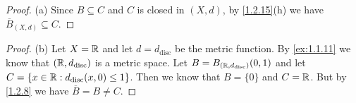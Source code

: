 \begin{proof}{(a)}
  Since \(B \subseteq C\) and \(C\) is closed in \((X, d)\), by \cref{1.2.15}(h) we have \(\overline{B}_{(X, d)} \subseteq C\).
\end{proof}

\begin{proof}{(b)}
  Let \(X = \mathbb{R}\) and let \(d = d_{\text{disc}}\) be the metric function.
  By \cref{ex:1.1.11} we know that \((\mathbb{R}, d_{\text{disc}})\) is a metric space.
  Let \(B = B_{(\mathbb{R}, d_{\text{disc}})}(0, 1)\) and let \(C = \{x \in \mathbb{R} : d_{\text{disc}}(x, 0) \leq 1\}\).
  Then we know that \(B = \{0\}\) and \(C = \mathbb{R}\).
  But by \cref{1.2.8} we have \(\overline{B} = B \neq C\).
\end{proof}